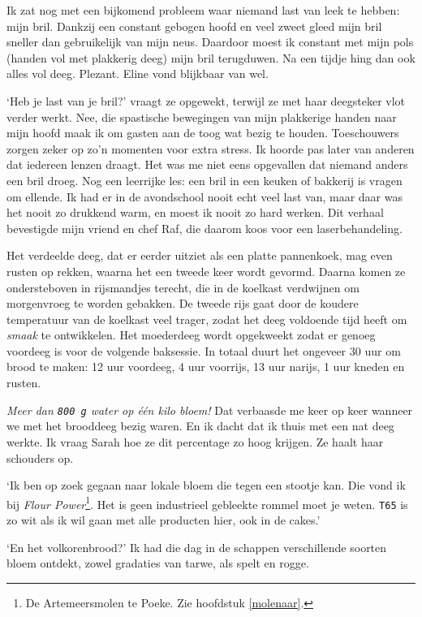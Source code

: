 \documentclass[
  11pt,
  dutch,
]{memoir}
\begin{document}
Ik zat nog met een bijkomend probleem waar niemand last van leek te
hebben: mijn bril. Dankzij een constant gebogen hoofd en veel zweet
gleed mijn bril sneller dan gebruikelijk van mijn neus. Daardoor moest
ik constant met mijn pols (handen vol met plakkerig deeg) mijn bril
terugduwen. Na een tijdje hing dan ook alles vol deeg. Plezant. Eline
vond blijkbaar van wel.

`Heb je last van je bril?' vraagt ze opgewekt, terwijl ze met haar
deegsteker vlot verder werkt. Nee, die spastische bewegingen van mijn
plakkerige handen naar mijn hoofd maak ik om gasten aan de toog wat
bezig te houden. Toeschouwers zorgen zeker op zo'n momenten voor extra
stress. Ik hoorde pas later van anderen dat iedereen lenzen draagt. Het
was me niet eens opgevallen dat niemand anders een bril droeg. Nog een
leerrijke les: een bril in een keuken of bakkerij is vragen om ellende.
Ik had er in de avondschool nooit echt veel last van, maar daar was het
nooit zo drukkend warm, en moest ik nooit zo hard werken. Dit verhaal
bevestigde mijn vriend en chef Raf, die daarom koos voor een
laserbehandeling.

Het verdeelde deeg, dat er eerder uitziet als een platte pannenkoek, mag
even rusten op rekken, waarna het een tweede keer wordt gevormd. Daarna
komen ze ondersteboven in rijsmandjes terecht, die in de koelkast
verdwijnen om morgenvroeg te worden gebakken. De tweede rijs gaat door
de koudere temperatuur van de koelkast veel trager, zodat het deeg
voldoende tijd heeft om \emph{smaak} te ontwikkelen. Het moederdeeg
wordt opgekweekt zodat er genoeg voordeeg is voor de volgende baksessie.
In totaal duurt het ongeveer 30 uur om brood te maken: 12 uur voordeeg,
4 uur voorrijs, 13 uur narijs, 1 uur kneden en rusten.

\emph{Meer dan \texttt{800\ g} water op één kilo bloem!} Dat verbaasde
me keer op keer wanneer we met het brooddeeg bezig waren. En ik dacht
dat ik thuis met een nat deeg werkte. Ik vraag Sarah hoe ze dit
percentage zo hoog krijgen. Ze haalt haar schouders op.

`Ik ben op zoek gegaan naar lokale bloem die tegen een stootje kan. Die
vond ik bij \emph{Flour Power}\footnote{De Artemeersmolen te Poeke. Zie
  hoofdstuk \ref{molenaar}.}. Het is geen industrieel gebleekte rommel
moet je weten. \texttt{T65} is zo wit als ik wil gaan met alle producten
hier, ook in de cakes.'

`En het volkorenbrood?' Ik had die dag in de schappen verschillende
soorten bloem ontdekt, zowel gradaties van tarwe, als spelt en rogge.
\end{document}
